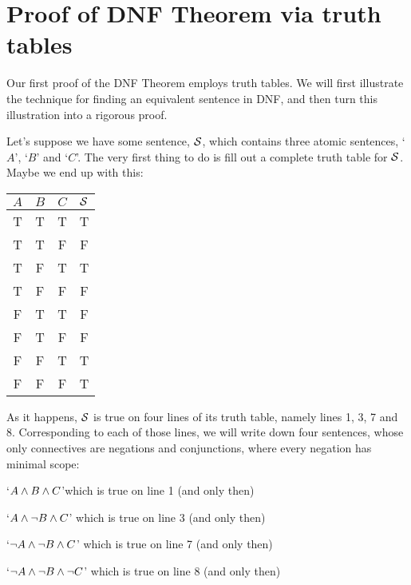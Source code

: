\section{Proof of DNF Theorem via truth tables}
\label{s:DNFTruthTable}

Our first proof of the DNF Theorem employs truth tables. We will first illustrate the technique for finding an equivalent sentence in DNF, and then turn this illustration into a rigorous proof. 

Let's suppose we have some sentence, $\mathcal{S}$, which contains three atomic sentences, `$A$', `$B$' and `$C$'. The very first thing to do is fill out a complete truth table for $\mathcal{S}$. Maybe we end up with this:
\begin{center}
\begin{tabular}{c c c | c}
$A$ & $B$ & $C$ & $\mathcal{S}$\\
\hline
 T & T & T & T \\
 T & T & F & F \\
 T & F & T & T \\
 T & F & F & F \\
 F & T & T & F \\
 F & T & F & F \\
 F & F & T & T \\
 F & F & F & T
\end{tabular}
\end{center}
%
%
As it happens, $\mathcal{S}$ is true on four lines of its truth table, namely lines 1, 3, 7 and 8. Corresponding to each of those lines, we will write down four sentences, whose only connectives are negations and conjunctions, where every negation has minimal scope:
	\begin{earg}
		\item  `$A \wedge B \wedge C$'\hfill which is true on line 1 (and only then)
		\item `$A \wedge \neg B \wedge C$' \hfill which is true on line 3 (and only then)
		\item `$\neg A \wedge \neg B \wedge C$' \hfill which is true on line 7 (and only then)
		\item `$\neg A \wedge \neg B \wedge \neg C$' \hfill which is true on line 8 (and only then)
	\end{earg}
